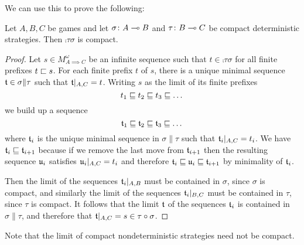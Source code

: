\documentclass{article}
\begin{document}
We can use this to prove the following:

\begin{proposition}
  Let $A,B,C$ be games and let $\sigma\colon A\multimap B$ and $\tau\colon B\multimap C$ be compact deterministic strategies.  Then $\comp\tau\sigma$ is compact.
  \begin{proof}
    Let $s\in M_{A\implies C}^\omega$ be an infinite sequence such that $t\in\comp\tau\sigma$ for all finite prefixes $t\sqsubset s$.  For each finite prefix $t$ of $s$, there is a unique minimal sequence $\mathfrak t\in\sigma\|\tau$ such that $\mathfrak t\vert_{A,C}=t$.  Writing $s$ as the limit of its finite prefixes
    \[
      t_1 \sqsubseteq t_2 \sqsubseteq t_3 \sqsubseteq \dots
      \]
    we build up a sequence
    \[
      \mathfrak t_1 \sqsubseteq \mathfrak t_2 \sqsubseteq \mathfrak t_3 \sqsubseteq \dots
      \]
    where $\mathfrak t_i$ is the unique minimal sequence in $\sigma\|\tau$ such that $\mathfrak t_i\vert_{A,C}=t_i$.  We have $\mathfrak t_i\sqsubseteq\mathfrak t_{i+1}$ because if we remove the last move from $\mathfrak t_{i+1}$ then the resulting sequence $\mathfrak u_i$ satisfies $\mathfrak u_i\vert_{A,C}=t_i$ and therefore $\mathfrak t_i\sqsubseteq\mathfrak u_i\sqsubseteq\mathfrak t_{i+1}$ by minimality of $\mathfrak t_i$.  

    Then the limit of the sequences $\mathfrak t_i\vert_{A,B}$ must be contained in $\sigma$, since $\sigma$ is compact, and similarly the limit of the sequences $\mathfrak t_i\vert_{B,C}$ must be contained in $\tau$, since $\tau$ is compact.  It follows that the limit $\mathfrak t$ of the sequences $\mathfrak t_i$ is contained in $\sigma\|\tau$, and therefore that $\mathfrak t\vert_{A,C}=s\in\tau \circ \sigma$.
  \end{proof}
\end{proposition}

Note that the limit of compact nondeterministic strategies need not be compact.
\end{document}
